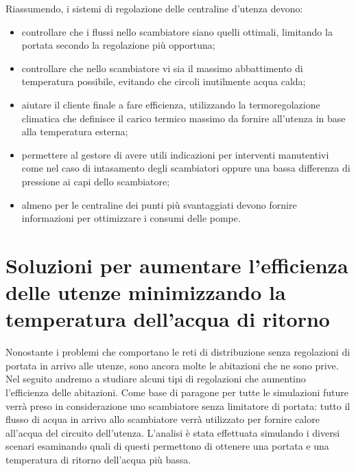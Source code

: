 \documentclass[laurea,oneside,11pt]{USiena_tesiLM3}
\begin{document}
Riassumendo, i sistemi di regolazione delle centraline d'utenza devono:
\begin{itemize}
\item controllare che i flussi nello scambiatore siano quelli ottimali, limitando la portata secondo la regolazione più opportuna;
\item controllare che nello scambiatore vi sia il massimo abbattimento di temperatura possibile, evitando che circoli inutilmente acqua calda;
\item aiutare il cliente finale a fare efficienza, utilizzando la termoregolazione climatica che definisce il carico termico massimo da fornire all'utenza in base alla temperatura esterna;
\item permettere al gestore di avere utili indicazioni per interventi manutentivi come nel caso di intasamento degli scambiatori oppure una bassa differenza di pressione ai capi dello scambiatore;
\item almeno per le centraline dei punti più svantaggiati devono fornire informazioni per ottimizzare i consumi delle pompe.
\end{itemize}

\section{Soluzioni per aumentare l'efficienza delle utenze minimizzando la temperatura dell'acqua di ritorno}
Nonostante i problemi che comportano le reti di distribuzione senza regolazioni di portata in arrivo alle utenze, sono ancora molte le abitazioni che ne sono prive.
Nel seguito andremo a studiare alcuni tipi di regolazioni che aumentino l'efficienza delle abitazioni. 
Come base di paragone per tutte le simulazioni future verrà preso in considerazione uno scambiatore senza limitatore di portata: tutto il flusso di acqua in arrivo allo scambiatore verrà utilizzato per fornire calore all'acqua del circuito dell'utenza. 
L'analisi è stata effettuata  simulando i diversi scenari esaminando quali di questi permettono di ottenere una portata e una temperatura di ritorno dell'acqua più bassa.
\end{document}
